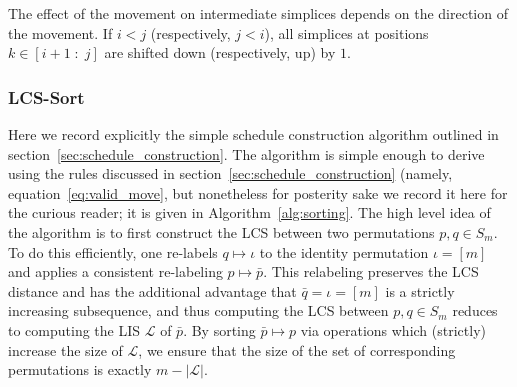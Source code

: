 \documentclass[sn-mathphys]{sn-jnl}
\newtheorem{proposition}{Proposition}
\begin{document}
\noindent The effect of the movement on intermediate simplices depends on the direction of the movement. If $i < j$ (respectively, $j < i$), all simplices at positions $k \in [i+1\;:\;j] $ are shifted down (respectively, up) by $1$. 

\subsubsection{LCS-Sort}
Here we record explicitly the simple schedule construction algorithm outlined in section~\ref{sec:schedule_construction}. The algorithm is simple enough to derive using the rules discussed in section~\ref{sec:schedule_construction} (namely, equation~\eqref{eq:valid_move}, but nonetheless for posterity sake we record it here for the curious reader; it is given in Algorithm~\ref{alg:sorting}.
The high level idea of the algorithm is to first construct the LCS between two permutations $p,q \in S_m$. To do this efficiently, one re-labels $q \mapsto \iota$ to the identity permutation $\iota = [m]$ and applies a consistent re-labeling $p \mapsto \bar{p}$. This relabeling preserves the LCS distance and has the additional advantage that $\bar{q} = \iota = [m]$ is a strictly increasing subsequence, and thus computing the LCS between $p,q \in S_m$ reduces to computing the LIS $\mathcal{L}$ of $\bar{p}$. 
By sorting $\bar{p} \mapsto p$ via operations which (strictly) increase the size of $\mathcal{L}$, we ensure that the size of the set of corresponding permutations is exactly $m - \lvert \mathcal{L} \rvert$. 
\end{document}
